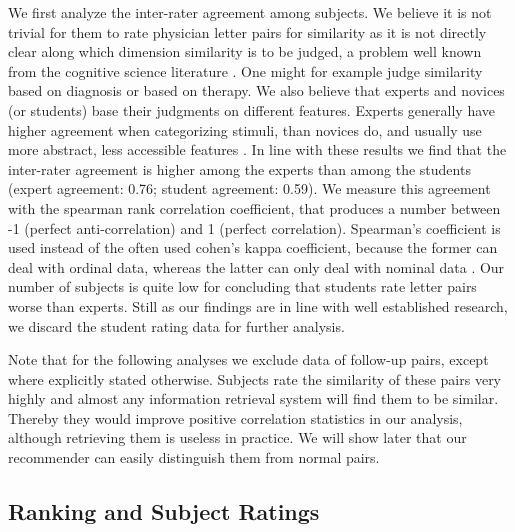 We first analyze the inter-rater agreement among subjects. We believe it is not trivial for them to rate physician letter pairs for similarity as it is not directly clear along which dimension similarity is to be judged, a problem well known from the cognitive science literature \citep{Medin1993}. One might for example judge similarity based on diagnosis or based on therapy. We also believe that experts and novices (or students) base their judgments on different features. Experts generally have higher agreement when categorizing stimuli, than novices do, and usually use more abstract, less accessible features \citep{Chi1981, Linhares2007, Leon-Villagra2013}. In line with these results we find that the inter-rater agreement is higher among the experts than among the students (expert agreement: 0.76; student agreement: 0.59). We measure this agreement with the spearman rank correlation coefficient, that produces a number between -1 (perfect anti-correlation) and 1 (perfect correlation). Spearman's coefficient is used instead of the often used cohen's kappa coefficient, because the former can deal with ordinal data, whereas the latter can only deal with nominal data \citep{Spearman1904, Cohen1960}. Our number of subjects is quite low for concluding that students rate letter pairs worse than experts. Still as our findings are in line with well established research, we discard the student rating data for further analysis. 

Note that for the following analyses we exclude data of follow-up pairs, except where explicitly stated otherwise. Subjects rate the similarity of these pairs very highly and almost any information retrieval system will find them to be similar. Thereby they would improve positive correlation statistics in our analysis, although retrieving them is useless in practice. We will show later that our recommender can easily distinguish them from normal pairs.

\subsection*{Ranking and Subject Ratings}

